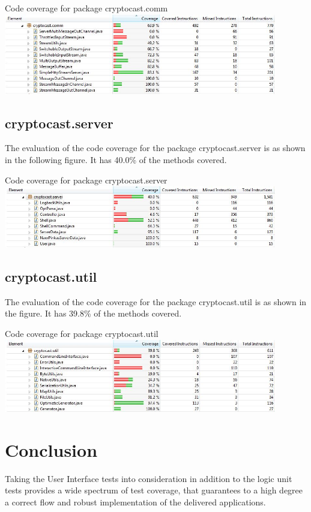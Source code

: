 \documentclass[a4paper,10pt]{scrartcl}
\begin{document}
\begin{illustration}{Code coverage for package cryptocast.comm}
\includegraphics[width=450px]{figures/images/comm.jpg}
\end{illustration}

\subsection{cryptocast.server}
The evaluation of the code coverage for the package cryptocast.server is as shown in the following figure.
It has 40.0\% of the methods covered.

\begin{illustration}{Code coverage for package cryptocast.server}
\includegraphics[width=450px]{figures/images/server.jpg}
\end{illustration}


\subsection{cryptocast.util}
The evaluation of the code coverage for the package cryptocast.util is as shown in the figure.
It has 39.8\% of the methods covered.

\begin{illustration}{Code coverage for package cryptocast.util}
\includegraphics[width=450px]{figures/images/util.jpg}
\end{illustration}


\section{Conclusion}
Taking the User Interface tests into consideration in addition to the logic unit tests provides a wide spectrum of test coverage, that guarantees to a high degree a correct flow and robust implementation of the delivered applications.
  
\end{document}
